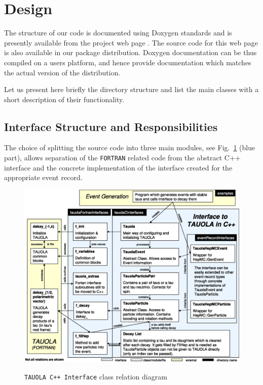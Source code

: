 \documentclass[]{Tauola_interface_design}
\begin{document}
\section{Design}

The structure of our code is documented using Doxygen standards \cite{Doxygen} and is
presently available from the project web page \cite{tauolaC++}. The
source code for this web page is also available in our package
distribution.  Doxygen documentation can be thus compiled on a users
platform, and hence provide documentation which matches the actual version of the
distribution. 

Let us present here briefly the directory structure and list the main classes
with a short description of their functionality.

\subsection{Interface Structure and Responsibilities}
\label{sec:structure}

The choice of splitting the source code into three main modules, 
see Fig.~\ref{fig:design} (blue part),
allows separation of the {\tt FORTRAN} related code from the abstract C++ interface
and the concrete implementation of the interface created for the appropriate
event record.

\begin{figure}[h!]
\centering
\includegraphics[scale=0.6]{figures/tauola_interface_design.eps}
\label{fig:design}
\caption{{\tt TAUOLA C++ Interface} class relation diagram}
\end{figure}
\end{document}
